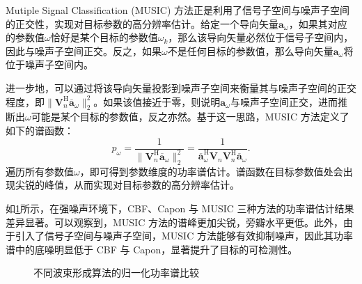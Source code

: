Mutiple Signal Classification (MUSIC) 方法正是利用了信号子空间与噪声子空间的正交性，实现对目标参数的高分辨率估计。给定一个导向矢量\( \bm{a}_{\omega} \)，如果其对应的参数值\( \omega \)恰好是某个目标的参数值\( \omega_k \)，那么该导向矢量必然位于信号子空间内，因此与噪声子空间正交。反之，如果\( \omega \)不是任何目标的参数值，那么导向矢量\( \bm{a}_{\omega} \)将位于噪声子空间内。

进一步地，可以通过将该导向矢量投影到噪声子空间来衡量其与噪声子空间的正交程度，即\( \|\mathbf{V}_{n}^{\mathrm{H}} \overline{\bm{a}}_{\omega}\|_2^2\)。如果该值接近于零，则说明\( \bm{a}_{\omega} \)与噪声子空间正交，进而推断出\( \omega \)可能是某个目标的参数值，反之亦然。基于这一思路，MUSIC 方法定义了如下的谱函数：
\[
    p_{\omega} = \frac{1}{\|\mathbf{V}_{n}^{\mathrm{H}} \overline{\bm{a}}_{\omega}\|_2^2} = \frac{1}{\overline{\bm{a}}_{\omega}^{\mathrm{H}} \mathbf{V}_{n} \mathbf{V}_{n}^{\mathrm{H}} \overline{\bm{a}}_{\omega}}.
\]
遍历所有参数值\( \omega \)，即可得到参数维度的功率谱估计。谱函数在目标参数值处会出现尖锐的峰值，从而实现对目标参数的高分辨率估计。

如\cref{fig_music_eg}所示，在强噪声环境下，CBF、Capon 与 MUSIC 三种方法的功率谱估计结果差异显著。可以观察到，MUSIC 方法的谱峰更加尖锐，旁瓣水平更低。此外，由于引入了信号子空间与噪声子空间，MUSIC 方法能够有效抑制噪声，因此其功率谱中的底噪明显低于 CBF 与 Capon，显著提升了目标的可检测性。
\begin{figure}[htb!]
    \centering
    \caption{不同波束形成算法的归一化功率谱比较}
    \label{fig_music_eg}
\end{figure}


